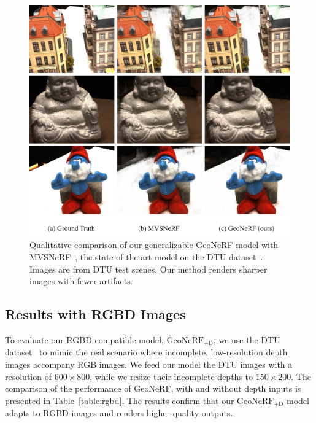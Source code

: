 \FloatBarrier

\begin{figure}[!t]
    \begin{center}
        \includegraphics[width=0.9\linewidth]{images/chapter3/figures/Fig3.jpg}
    \end{center}
   \caption{Qualitative comparison of our generalizable GeoNeRF model with MVSNeRF~\citep{chen2021mvsnerf}, the state-of-the-art model on the DTU dataset~\citep{jensen2014large}. Images are from DTU test scenes. Our method renders sharper images with fewer artifacts.}
    \label{fig:c3_qualitative_dtu}
\end{figure}

\subsection{Results with RGBD Images} \label{sec:c3_rgbd}
To evaluate our RGBD compatible model, $\text{GeoNeRF}_{\text{+D}}$, we use the DTU dataset~\citep{jensen2014large} to mimic the real scenario where incomplete, low-resolution depth images accompany RGB images. We feed our model the DTU images with a resolution of $600 \times 800$, while we resize their incomplete depths to $150 \times 200$. The comparison of the performance of GeoNeRF, with and without depth inputs is presented in Table~\ref{table:rgbd}. The results confirm that our $\text{GeoNeRF}_{\text{+D}}$ model adapts to RGBD images and renders higher-quality outputs.


